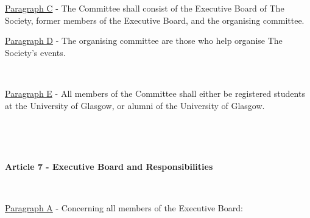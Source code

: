 \underline{Paragraph C} - The Committee shall consist of the Executive
Board of The Society, former members of the Executive Board, and the
organising committee.

\underline{Paragraph D} - The organising committee are those who help
organise The Society's events.

~

\underline{Paragraph E} - All members of the Committee shall either be
registered students at the University of Glasgow, or
alumni of the University of Glasgow.

~

~

\large{\textbf{Article 7 - Executive Board and Responsibilities}}

~

\underline{Paragraph A} - Concerning all members of the Executive Board:

